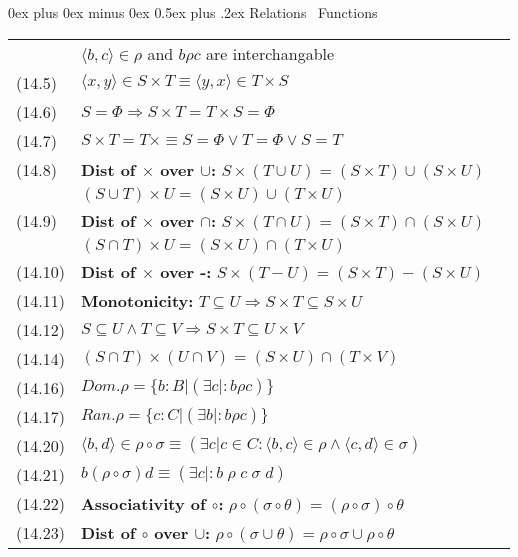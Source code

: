 \documentclass[letterpaper, 8pt]{extarticle}
\makeatletter
\renewcommand{\section}{\@startsection{section}{1}{0mm}%
                                {0ex plus 0ex minus 0ex}%
                                {0.5ex plus .2ex}%
                                {\normalfont\normalsize\bfseries}}
\makeatother
\begin{document}
\begin{multicols*}{3}
    \section{Relations \ Functions}
    \begin{tabulary}{\linewidth}{@{}lLL@{}}
        & $\langle b, c \rangle \in \rho$ and $b \rho c$ are interchangable \\
        (14.5) & $\langle x, y \rangle \in S \times T \equiv \langle y, x \rangle \in T \times S$ &\\
        (14.6) & $S = \Phi \Rightarrow S \times T = T \times S = \Phi$ &\\
        (14.7) & $S \times T = T \times \equiv S = \Phi \lor T = \Phi \lor S = T$ &\\
        (14.8) &\textbf{Dist of $\times$ over $\cup$: } $S \times (T \cup U) = (S \times T) \cup (S \times U)$& \\
        & $(S \cup T) \times U = (S \times U) \cup (T \times U)$ &\\
        (14.9) &\textbf{Dist of $\times$ over $\cap$: } $S \times (T \cap U) = (S \times T) \cap (S \times U)$& \\
        & $(S \cap T) \times U = (S \times U) \cap (T \times U)$ &\\
        (14.10) &\textbf{Dist of $\times$ over -: } $S \times (T - U) = (S \times T) - (S \times U)$& \\
        (14.11) &\textbf{Monotonicity: } $T \subseteq U \Rightarrow S \times T \subseteq S \times U$& \\
        (14.12) & $S \subseteq U \land T \subseteq V \Rightarrow S \times T \subseteq U \times V$ &\\
        (14.14) & $(S \cap T) \times (U \cap V) = (S \times U) \cap (T \times V)$ &\\
        (14.16) & $Dom.\rho = \{b:B| (\exists c|: b \rho c)\}$ &\\
        (14.17) & $Ran.\rho = \{c:C| (\exists b|: b \rho c)\}$ &\\
        (14.20) & $\langle b, d \rangle \in \rho \circ \sigma \equiv (\exists c| c \in C: \langle b, c \rangle \in \rho \land \langle c, d \rangle \in \sigma)$ &\\
        (14.21) & $b (\rho \circ \sigma) d \equiv (\exists c|: b \; \rho \; c \; \sigma \; d)$ &\\
        (14.22) & \textbf{Associativity of $\circ$:}   $\rho \circ (\sigma \circ \theta) = (\rho \circ \sigma) \circ \theta$&\\
        (14.23) & \textbf{Dist of $\circ$ over $\cup$:}  $\rho \circ (\sigma \cup \theta) = \rho \circ \sigma \cup \rho \circ \theta$&\\

\end{tabulary}
\end{multicols*}
\end{document}
